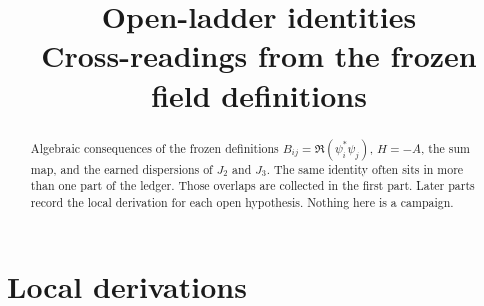 \documentclass[11pt]{article}
\title{Open-ladder identities\\[0.4em]
\large Cross-readings from the frozen field definitions}
\author{}
\date{}
\theoremstyle{remark}
\begin{document}
\maketitle
\begin{abstract}
\noindent
Algebraic consequences of the frozen definitions
\(B_{ij}=\Re(\psi_i^*\psi_j)\), \(H=-A\), the sum map, and the earned
dispersions of \(J_2\) and \(J_3\).
The same identity often sits in more than one part of the ledger.
Those overlaps are collected in the first part.
Later parts record the local derivation for each open hypothesis.
Nothing here is a campaign.
\end{abstract}
\tableofcontents

\part{Local derivations}




































\end{document}

